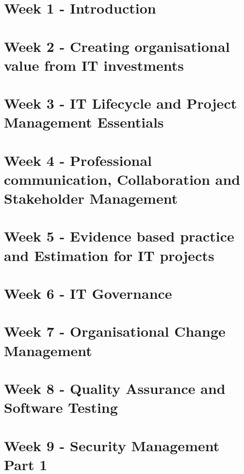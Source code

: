 \documentclass[12pt]{article}
\begin{document}



\pagebreak

\section{Week 1 - Introduction}

\pagebreak

\section{Week 2 - Creating organisational value from IT investments}

\pagebreak

\section{Week 3 - IT Lifecycle and Project Management Essentials}

\pagebreak

\section{Week 4 - Professional communication, Collaboration and Stakeholder Management}

\pagebreak

\section{Week 5 - Evidence based practice and Estimation for IT projects}

\pagebreak

\section{Week 6 - IT Governance}

\pagebreak

\section{Week 7 - Organisational Change Management}

\pagebreak

\section{Week 8 - Quality Assurance and Software Testing}

\pagebreak

\section{Week 9 - Security Management Part 1}

\pagebreak
\end{document}
